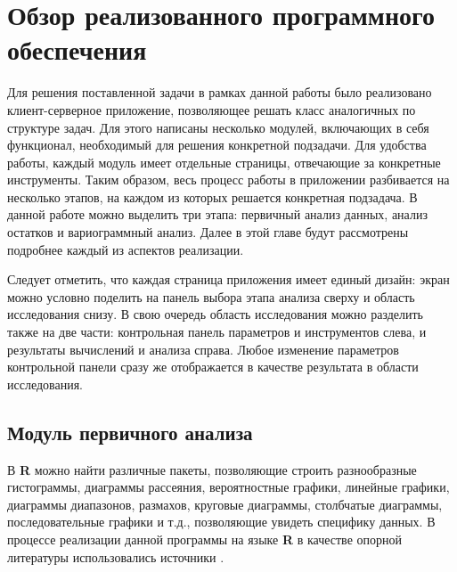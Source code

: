 
\newpage

\chapter{Обзор реализованного программного обеспечения}

Для решения поставленной задачи в рамках данной работы было реализовано клиент-серверное приложение, позволяющее решать класс аналогичных по структуре задач. Для этого написаны несколько модулей, включающих в себя функционал, необходимый для решения конкретной подзадачи. Для удобства работы, каждый модуль имеет отдельные страницы, отвечающие за конкретные инструменты. Таким образом, весь процесс работы в приложении разбивается на несколько этапов, на каждом из которых решается конкретная подзадача. В данной работе можно выделить три этапа: первичный анализ данных, анализ остатков и вариограммный анализ. Далее в этой главе будут рассмотрены подробнее каждый из аспектов реализации.

Следует отметить, что каждая страница приложения имеет единый дизайн: экран можно условно поделить на панель выбора этапа анализа сверху и область исследования снизу. В свою очередь область исследования можно разделить также на две части: контрольная панель параметров и инструментов слева, и результаты вычислений и анализа справа. Любое изменение параметров контрольной панели сразу же отображается в качестве результата в области исследования.

\section{Модуль первичного анализа} %
\label{sec:mod_basis}

В \textbf{R} можно найти различные пакеты, позволяющие строить разнообразные гистограммы, диаграммы рассеяния, вероятностные графики, линейные графики, диаграммы диапазонов, размахов, круговые диаграммы, столбчатые диаграммы, последовательные графики и т.д., позволяющие увидеть специфику данных. В процессе реализации данной программы на языке \textbf{R} в качестве опорной литературы использовались источники \cite{Kabacoff2009R, Teetor2011RCook, Chang2012RGraph}.

